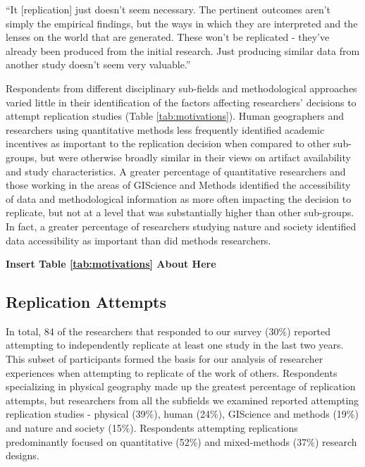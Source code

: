 \documentclass[]{interact}
\theoremstyle{plain}%
\theoremstyle{definition}
\theoremstyle{remark}
\begin{document}
\begin{displayquote}
    ``It [replication] just doesn't seem necessary. The pertinent outcomes aren't simply the empirical findings, but the ways in which they are interpreted and the lenses on the world that are generated. These won't be replicated - they've already been produced from the initial research. Just producing similar data from another study doesn't seem very valuable.''
\end{displayquote}

Respondents from different disciplinary sub-fields and methodological approaches varied little in their identification of the factors affecting researchers' decisions to attempt replication studies (Table \ref{tab:motivations}). 
Human geographers and researchers using quantitative methods less frequently identified academic incentives as important to the replication decision when compared to other sub-groups, but were otherwise broadly similar in their views on artifact availability and study characteristics. 
A greater percentage of quantitative researchers and those working in the areas of GIScience and Methods identified the accessibility of data and methodological information as more often impacting the decision to replicate, but not at a level that was substantially higher than other sub-groups. 
In fact, a greater percentage of researchers studying nature and society identified data accessibility as important than did methods researchers.  

\begin{center}
\textbf{Insert Table \ref{tab:motivations} About Here}
\end{center}

\subsection*{Replication Attempts}
In total, 84 of the researchers that responded to our survey (30\%) reported attempting to independently replicate at least one study in the last two years.   
This subset of participants formed the basis for our analysis of researcher experiences when attempting to replicate of the work of others.
Respondents specializing in physical geography made up the greatest percentage of replication attempts, but researchers from all the subfields we examined reported attempting replication studies - physical (39\%), human (24\%), GIScience and methods (19\%) and nature and society (15\%).  
Respondents attempting replications predominantly focused on quantitative (52\%) and mixed-methods (37\%) research designs. 
\end{document}
